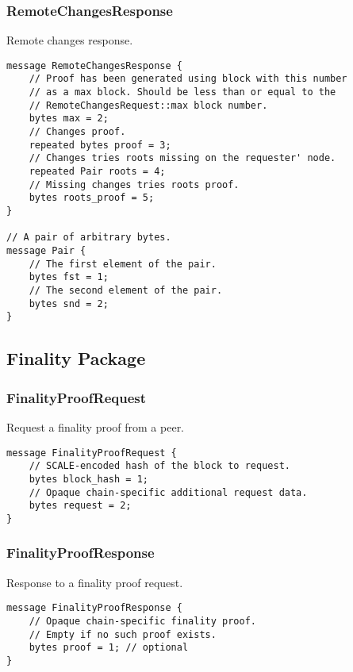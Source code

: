 \documentclass{book}
\begin{document}
\subsubsection{RemoteChangesResponse}

Remote changes response.

\begin{lstlisting}[frame=single]
message RemoteChangesResponse {
    // Proof has been generated using block with this number
    // as a max block. Should be less than or equal to the
    // RemoteChangesRequest::max block number.
	bytes max = 2;
	// Changes proof.
	repeated bytes proof = 3;
	// Changes tries roots missing on the requester' node.
	repeated Pair roots = 4;
	// Missing changes tries roots proof.
	bytes roots_proof = 5;
}

// A pair of arbitrary bytes.
message Pair {
	// The first element of the pair.
	bytes fst = 1;
	// The second element of the pair.
	bytes snd = 2;
}
\end{lstlisting}

\subsection{Finality Package}

\subsubsection{FinalityProofRequest}

Request a finality proof from a peer.

\begin{lstlisting}[frame=single]
message FinalityProofRequest {
	// SCALE-encoded hash of the block to request.
	bytes block_hash = 1;
	// Opaque chain-specific additional request data.
	bytes request = 2;
}
\end{lstlisting}

\subsubsection{FinalityProofResponse}

Response to a finality proof request.

\begin{lstlisting}[frame=single]
message FinalityProofResponse {
    // Opaque chain-specific finality proof.
    // Empty if no such proof exists.
	bytes proof = 1; // optional
}
\end{lstlisting}
\end{document}
